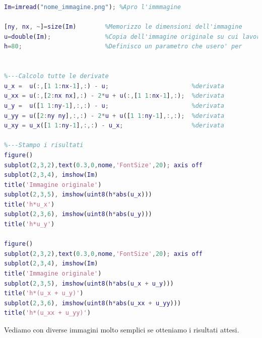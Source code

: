\begin{lstlisting}[language=MATLAB]
%---Operazioni preliminari
Im=imread("nome_immagine.png");	%Apro l'immmagine

[ny, nx, ~]=size(Im)        %Memorizzo le dimensioni dell'immagine
u=double(Im);               %Copia dell'immagine originale su cui lavorare
h=80;                       %Definisco un parametro che usero' per                               enfatizzare i bordi in fase di stampa 


%---Calcolo tutte le derivate
u_x =  u(:,[1 1:nx-1],:) - u;                       %derivata                                                            prima lungo x
u_xx = u(:,[2:nx nx],:) - 2*u + u(:,[1 1:nx-1],:);  %derivata                                                            seconda lungo x
u_y =  u([1 1:ny-1],:,:) - u;                       %derivata                                                            prima lungo y
u_yy = u([2:ny ny],:,:) - 2*u + u([1 1:ny-1],:,:);  %derivata                                                            seconda lungo y
u_xy = u_x([1 1:ny-1],:,:) - u_x;                   %derivata                                                            seconda mista
   
%---Stampo i risultati
figure()
subplot(2,3,2),text(0.3,0,nome,'FontSize',20); axis off
subplot(2,3,4), imshow(Im)
title('Immagine originale')
subplot(2,3,5), imshow(uint8(h*abs(u_x)))
title('h*u_x')
subplot(2,3,6), imshow(uint8(h*abs(u_y)))
title('h*u_y')

figure()
subplot(2,3,2),text(0.3,0,nome,'FontSize',20); axis off
subplot(2,3,4), imshow(Im)
title('Immagine originale')
subplot(2,3,5), imshow(uint8(h*abs(u_x + u_y)))
title('h*(u_x + u_y)')
subplot(2,3,6), imshow(uint8(h*abs(u_xx + u_yy)))
title('h*(u_xx + u_yy)')
\end{lstlisting}

\vspace{6em}
Vediamo con diverse immagini molto semplici se otteniamo i risultati attesi.\\

